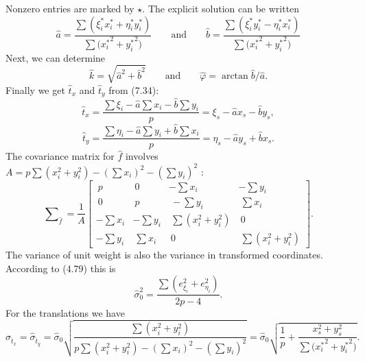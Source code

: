Nonzero entries are marked by $\star$. The explicit solution can be written
\begin{equation}
\hat{a} = \frac{\sum(\xi_{i}^{\ast} x_{i}^{\ast} + \eta_{i}^{\ast} y_{i}^{\ast})}
{\sum{(x_{i}^{\ast}}^{2}  + {y_{i}^{\ast}}^{2})}
\qquad \text{and} \qquad
\hat{b} = \frac{\sum(\xi_{i}^{\ast} y_{i}^{\ast} - \eta_{i}^{\ast} x_{i}^{\ast})}
{\sum{(x_{i}^{\ast}}^{2}  + {y_{i}^{\ast}}^{2})}
\end{equation}
Next, we can determine
\begin{equation}
\hat{k} = \sqrt{{\hat{a}}^2 + {\hat{b}}^2}
\qquad \text{and} \qquad
\hat{\varphi} = \arctan{\hat{b} / \hat{a}}.
\end{equation}
Finally we get $\hat{t}_x$ and $\hat{t}_y$ from (7.34):
\begin{equation}
\hat{t}_x = \frac{\sum \xi_i - \hat{a}\sum x_i - \hat{b}\sum y_i}{p}
= \xi_s - \hat{a}x_s - \hat{b}y_s,
\end{equation}
\begin{equation}
\hat{t}_y = \frac{\sum \eta_i - \hat{a}\sum y_i + \hat{b}\sum x_i}{p}
= \eta_s - \hat{a}y_s + \hat{b}x_s.
\end{equation}
The covariance matrix for $\hat{f}$ involves $A = p\sum(x_{i}^{2} + y_{i}^{2})
- (\sum x_{i})^{2}- (\sum y_{i})^{2}$ :
\begin{equation*}
\sum\nolimits_{\hat{f}} = \frac{1}{A}
\begin{bmatrix}
\ p       & \ 0        & -\sum x_i                      &-\sum y_i\\
\ 0       & \ p        & \ -\sum y_i                    &\ \sum x_i\\
-\sum x_i & -\sum y_i  & \ \sum(x_{i}^{2} + y_{i}^{2})  &\ 0\\
-\sum y_i & \ \sum x_i & \ 0                            &\ \sum(x_{i}^{2} + y_{i}^{2})
\end{bmatrix}.
\end{equation*}
The variance of unit weight is also the variance in transformed coordinates. According to
(4.79) this is
\begin{equation*}
\hat{\sigma}_{0}^{2} = \frac{\sum(e_{\xi_i}^{2} + e_{\eta_i}^{2})}{2p - 4}.
\end{equation*}
For the translations we have
\begin{equation}
\hat{\sigma}_{\hat{t}_x} = \hat{\sigma}_{\hat{t}_y}
= \hat{\sigma}_0\sqrt{\frac{\sum(x_{i}^{2} + y_{i}^{2})}{p\sum(x_{i}^{2} + y_{i}^{2})
		- (\sum x_{i})^{2} - (\sum y_{i})^{2}}}
= \hat{\sigma}_0\sqrt{\frac{1}{p} + \frac{x_{s}^{2} + y_{s}^{2}}{{\sum({x_{i}^\ast}}^{2} + {y_{i}^{\ast}}^{2})}}.
\end{equation}
